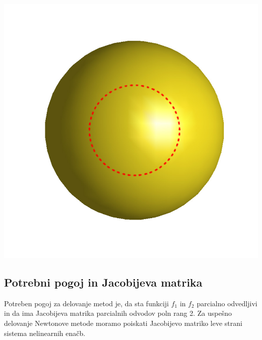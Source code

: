\documentclass[]{article}
\begin{document}
	\includegraphics[scale=0.2]{eul3_newt}
	
\subsection{Potrebni pogoj in Jacobijeva matrika}
	Potreben pogoj za delovanje metod je, da sta funkciji $f_{1}$ in $f_{2}$ parcialno odvedljivi in da ima Jacobijeva matrika parcialnih odvodov poln rang 2. Za uspešno delovanje Newtonove metode moramo poiskati Jacobijevo matriko leve strani sistema nelinearnih enačb.
\end{document}
